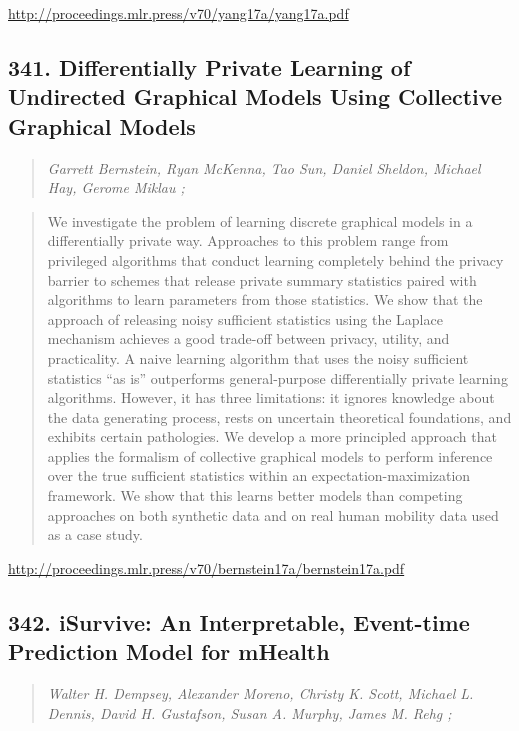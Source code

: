 \documentclass{article}
\begin{document}
\href{http://proceedings.mlr.press/v70/yang17a/yang17a.pdf}{http://proceedings.mlr.press/v70/yang17a/yang17a.pdf}

\subsection{341. Differentially Private Learning of Undirected Graphical Models Using Collective Graphical Models}

\begin{quote}
\footnotesize{\textit{Garrett Bernstein, Ryan McKenna, Tao Sun, Daniel Sheldon, Michael Hay, Gerome Miklau ;}}
\end{quote}

\begin{quote}
    We investigate the problem of learning discrete graphical models in a differentially private way. Approaches to this problem range from privileged algorithms that conduct learning completely behind the privacy barrier to schemes that release private summary statistics paired with algorithms to learn parameters from those statistics. We show that the approach of releasing noisy sufficient statistics using the Laplace mechanism achieves a good trade-off between privacy, utility, and practicality. A naive learning algorithm that uses the noisy sufficient statistics “as is” outperforms general-purpose differentially private learning algorithms. However, it has three limitations: it ignores knowledge about the data generating process, rests on uncertain theoretical foundations, and exhibits certain pathologies. We develop a more principled approach that applies the formalism of collective graphical models to perform inference over the true sufficient statistics within an expectation-maximization framework. We show that this learns better models than competing approaches on both synthetic data and on real human mobility data used as a case study.  \end{quote}

\href{http://proceedings.mlr.press/v70/bernstein17a/bernstein17a.pdf}{http://proceedings.mlr.press/v70/bernstein17a/bernstein17a.pdf}

\subsection{342. iSurvive: An Interpretable, Event-time Prediction Model for mHealth}

\begin{quote}
\footnotesize{\textit{Walter H. Dempsey, Alexander Moreno, Christy K. Scott, Michael L. Dennis, David H. Gustafson, Susan A. Murphy, James M. Rehg ;}}
\end{quote}
\end{document}
